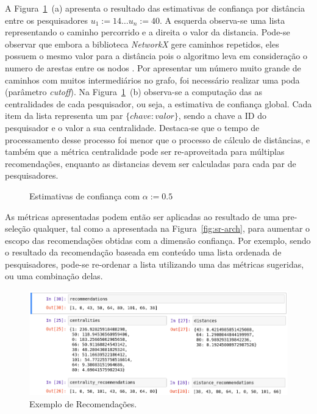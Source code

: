 \documentclass[12pt]{article}
\begin{document}
A Figura~\ref{fig:trust-estimative-results}~(a) apresenta o resultado das estimativas de confiança por distância entre os pesquisadores $u_1 := 14  \dots u_n := 40$. A esquerda observa-se uma lista representando o caminho percorrido e a direita o valor da distancia. Pode-se observar que embora a biblioteca \textit{NetworkX} gere caminhos repetidos, eles possuem o mesmo valor para a distância pois o algoritmo leva em consideração o numero de arestas entre os nodos \cite{opsahl2010node}. Por apresentar um número muito grande de caminhos com muitos intermediários no grafo, foi necessário realizar uma poda (parâmetro \textit{cutoff}). Na Figura~\ref{fig:trust-estimative-results}~(b) observa-se a computação das as centralidades de cada pesquisador, ou seja, a estimativa de confiança global. Cada item da lista representa um par $\{chave: valor\}$, sendo a chave a ID do pesquisador e o valor a sua centralidade. Destaca-se que o tempo de processamento desse processo foi menor que o processo de cálculo de distâncias, e também que a métrica centralidade pode ser re-aproveitada para múltiplas recomendações, enquanto as distancias devem ser calculadas para cada par de pesquisadores.

\begin{figure}
    \centering
    \hfill
    \hfill
    \hfill
    \caption{Estimativas de confiança com $\alpha := 0.5$}
    \label{fig:trust-estimative-results}
\end{figure}

As métricas apresentadas podem então ser aplicadas ao resultado de uma pre-seleção qualquer, tal como a apresentada na Figura~\ref{fig:sr-arch}, para aumentar o escopo das recomendações obtidas com a dimensão confiança. Por exemplo, sendo o resultado da recomendação baseada em conteúdo uma lista ordenada de pesquisadores, pode-se re-ordenar a lista utilizando uma das métricas sugeridas, ou uma combinação delas.

\begin{figure}[ht]
\centering
  \includegraphics[width=1\textwidth]{peer-recommendations.png}
  \caption{Exemplo de Recomendações.}
  \label{fig:peer-recommendations}
\end{figure}
\end{document}
